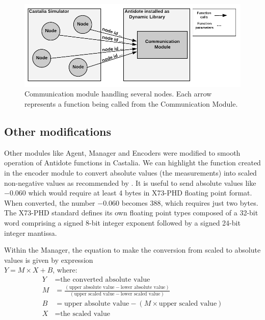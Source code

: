 \begin{figure}[htbp]
\centerline{\includegraphics[scale=0.31]{figures/communicationModule.png}}
\caption{Communication module handling several nodes. Each arrow represents a function being called from the Communication Module.}
\label{fig:communicationModuleCastalia}
\end{figure}

\subsection{Other modifications}

Other modules like Agent, Manager and Encoders were modified to smooth operation of Antidote functions in Castalia. We can highlight the function created in the encoder module to convert absolute values (the measurements) into scaled non-negative values as recommended by \cite{b1}.
It is useful to send absolute values like $-0.060$  which would require at least 4 bytes in X73-PHD floating point format. When converted, the number $-0.060$ becomes $388$, which requires just two bytes. The X73-PHD standard defines its own floating point types composed of a 32-bit word comprising a signed 8-bit integer exponent followed by a signed 24-bit integer mantissa.

Within the Manager, the equation to make the conversion from scaled to absolute values is given by expression\\$Y = M \times X + B$, where:
\begin{align*}
    Y &= \text{the converted absolute value}\\
    M &= \frac{(\text{upper absolute value} - \text{lower absolute value})}{(\text{upper scaled value} - \text{lower scaled value})}\\
    B &= \text{upper absolute value} - (M \times \text{upper scaled value})\\
    X &= \text{the scaled value}
\end{align*}

